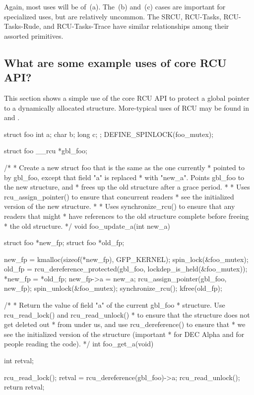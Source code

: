 Again, most uses will be of~(a).
The~(b) and~(c) cases are important
for specialized uses, but are relatively uncommon.
The SRCU, RCU-Tasks, RCU-Tasks-Rude, and RCU-Tasks-Trace have similar relationships among
their assorted primitives.

\subsection{What are some example uses of core RCU API?}
\label{sec:rcu:What are some example uses of core RCU API?}

This section shows a simple use of the core RCU API to protect a
global pointer to a dynamically allocated structure.
More-typical
uses of RCU may be found in  and .

\begin{VerbatimU}[samepage=false,breaklines=true]
	struct foo {
		int a;
		char b;
		long c;
	};
	DEFINE_SPINLOCK(foo_mutex);

	struct foo __rcu *gbl_foo;

	/*
	 * Create a new struct foo that is the same as the one currently
	 * pointed to by gbl_foo, except that field "a" is replaced
	 * with "new_a".  Points gbl_foo to the new structure, and
	 * frees up the old structure after a grace period.
	 *
	 * Uses rcu_assign_pointer() to ensure that concurrent readers
	 * see the initialized version of the new structure.
	 *
	 * Uses synchronize_rcu() to ensure that any readers that might
	 * have references to the old structure complete before freeing
	 * the old structure.
	 */
	void foo_update_a(int new_a)
	{
		struct foo *new_fp;
		struct foo *old_fp;

		new_fp = kmalloc(sizeof(*new_fp), GFP_KERNEL);
		spin_lock(&foo_mutex);
		old_fp = rcu_dereference_protected(gbl_foo, lockdep_is_held(&foo_mutex));
		*new_fp = *old_fp;
		new_fp->a = new_a;
		rcu_assign_pointer(gbl_foo, new_fp);
		spin_unlock(&foo_mutex);
		synchronize_rcu();
		kfree(old_fp);
	}

	/*
	 * Return the value of field "a" of the current gbl_foo
	 * structure.  Use rcu_read_lock() and rcu_read_unlock()
	 * to ensure that the structure does not get deleted out
	 * from under us, and use rcu_dereference() to ensure that
	 * we see the initialized version of the structure (important
	 * for DEC Alpha and for people reading the code).
	 */
	int foo_get_a(void)
	{
		int retval;

		rcu_read_lock();
		retval = rcu_dereference(gbl_foo)->a;
		rcu_read_unlock();
		return retval;
	}
\end{VerbatimU}

